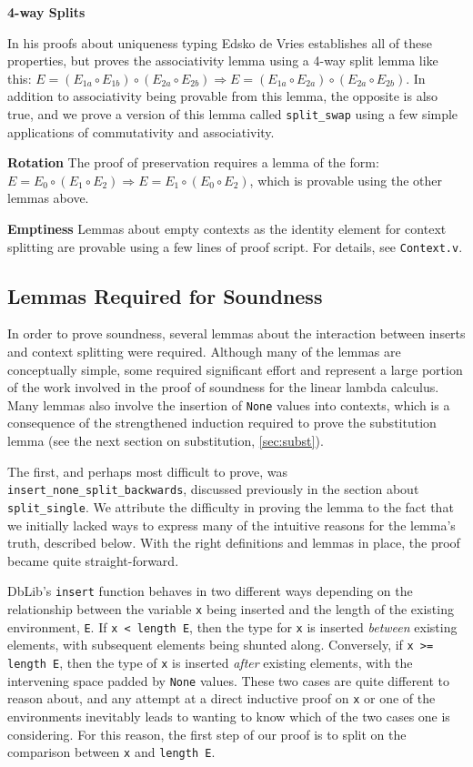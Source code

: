 \documentclass[]{unswthesis}
\let\c\texttt
\let\i\textit
\begin{document}
\textbf{4-way Splits}

In his proofs about uniqueness typing Edsko de Vries \cite{deVries07, deVriesPhD08} establishes all of these properties, but proves the associativity lemma using a 4-way split lemma like this: $E = (E_{1a} \circ E_{1b}) \circ (E_{2a} \circ E_{2b}) \Rightarrow E = (E_{1a} \circ E_{2a}) \circ (E_{2a} \circ E_{2b})$. In addition to associativity being provable from this lemma, the opposite is also true, and we prove a version of this lemma called \c{split_swap} using a few simple applications of commutativity and associativity.

\textbf{Rotation} The proof of preservation requires a lemma of the form: $E = E_0 \circ (E_1 \circ E_2) \Rightarrow E = E_1 \circ (E_0 \circ E_2)$, which is provable using the other lemmas above.

\textbf{Emptiness} Lemmas about empty contexts as the identity element for context splitting are provable using a few lines of proof script. For details, see \c{Context.v}. %

\subsection{Lemmas Required for Soundness}

In order to prove soundness, several lemmas about the interaction between inserts and context splitting were required. Although many of the lemmas are conceptually simple, some required significant effort and represent a large portion of the work involved in the proof of soundness for the linear lambda calculus. Many lemmas also involve the insertion of \c{None} values into contexts, which is a consequence of the strengthened induction required to prove the substitution lemma (see the next section on substitution, \cref{sec:subst}).

The first, and perhaps most difficult to prove, was \c{insert_none_split_backwards}, discussed previously in the section about \c{split_single}. We attribute the difficulty in proving the lemma to the fact that we initially lacked ways to express many of the intuitive reasons for the lemma's truth, described below. With the right definitions and lemmas in place, the proof became quite straight-forward.

DbLib's \c{insert} function behaves in two different ways depending on the relationship between the variable \c{x} being inserted and the length of the existing environment, \c{E}. If \c{x < length E}, then the type for \c{x} is inserted \i{between} existing elements, with subsequent elements being shunted along. Conversely, if \c{x >= length E}, then the type of \c{x} is inserted \i{after} existing elements, with the intervening space padded by \c{None} values. These two cases are quite different to reason about, and any attempt at a direct inductive proof on \c{x} or one of the environments inevitably leads to wanting to know which of the two cases one is considering. For this reason, the first step of our proof is to split on the comparison between \c{x} and \c{length E}.
\end{document}
